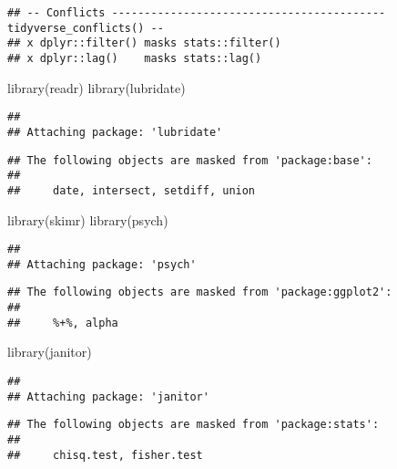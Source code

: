 \documentclass[
]{article}
\newenvironment{Shaded}{\begin{snugshade}}{\end{snugshade}}
\newcommand{\FunctionTok}[1]{\textcolor[rgb]{0.00,0.00,0.00}{#1}}
\newcommand{\NormalTok}[1]{#1}
\begin{document}
\begin{verbatim}
## -- Conflicts ------------------------------------------ tidyverse_conflicts() --
## x dplyr::filter() masks stats::filter()
## x dplyr::lag()    masks stats::lag()
\end{verbatim}

\begin{Shaded}
\begin{Highlighting}[]
\FunctionTok{library}\NormalTok{(readr)}
\FunctionTok{library}\NormalTok{(lubridate)}
\end{Highlighting}
\end{Shaded}

\begin{verbatim}
## 
## Attaching package: 'lubridate'
\end{verbatim}

\begin{verbatim}
## The following objects are masked from 'package:base':
## 
##     date, intersect, setdiff, union
\end{verbatim}

\begin{Shaded}
\begin{Highlighting}[]
\FunctionTok{library}\NormalTok{(skimr)}
\FunctionTok{library}\NormalTok{(psych)}
\end{Highlighting}
\end{Shaded}

\begin{verbatim}
## 
## Attaching package: 'psych'
\end{verbatim}

\begin{verbatim}
## The following objects are masked from 'package:ggplot2':
## 
##     %+%, alpha
\end{verbatim}

\begin{Shaded}
\begin{Highlighting}[]
\FunctionTok{library}\NormalTok{(janitor)}
\end{Highlighting}
\end{Shaded}

\begin{verbatim}
## 
## Attaching package: 'janitor'
\end{verbatim}

\begin{verbatim}
## The following objects are masked from 'package:stats':
## 
##     chisq.test, fisher.test
\end{verbatim}
\end{document}
